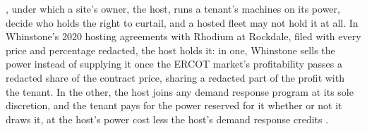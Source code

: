 , under which a site's owner, the host, runs a tenant's machines on its power, decide who holds the right to curtail, and a hosted fleet may not hold it at all. In Whinstone's 2020 hosting agreements with Rhodium at Rockdale, filed with every price and percentage redacted, the host holds it: in one, Whinstone sells the power instead of supplying it once the ERCOT market's profitability passes a redacted share of the contract price, sharing a redacted part of the profit with the tenant. In the other, the host joins any demand response program at its sole discretion, and the tenant pays for the power reserved for it whether or not it draws it, at the host's power cost less the host's demand response credits \autocite{whinstone2020hosting30mw,whinstone2020hostingjv}. %
